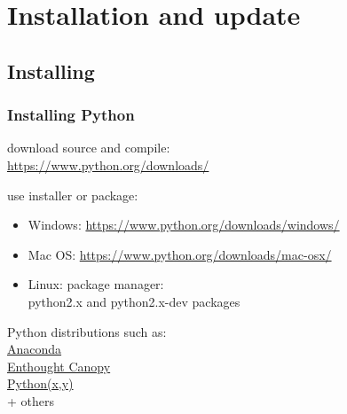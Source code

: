 \section{Installation and update}

\subsection{Installing}

\begin{frame}
\frametitle{Installing Python}

\begin{description}

\item<1->[Hard way:] download source and compile:\\
\url{https://www.python.org/downloads/}

\item<2->[Normal way:] use installer or package:

\begin{itemize}
\item Windows: \url{https://www.python.org/downloads/windows/}
\item Mac OS: \url{https://www.python.org/downloads/mac-osx/}
\item Linux: package manager:\\
python2.x and python2.x-dev packages
\end{itemize}

\item<3->[Easy way:] Python distributions such as:\\
\href{https://www.continuum.io/downloads}{Anaconda} \\
\href{https://www.enthought.com/products/canopy/}{Enthought Canopy} \\
\href{http://python-xy.github.io/}{Python(x,y)} \\
+ others

\end{description}

\end{frame}

